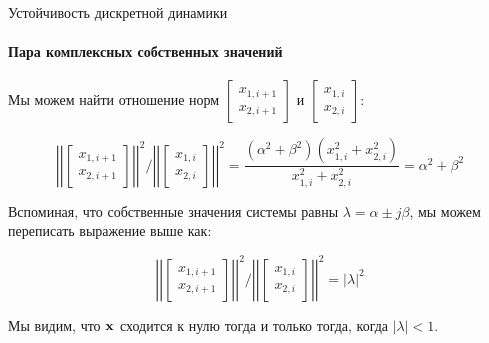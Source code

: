 \documentclass{beamer}
\begin{document}
\begin{frame}{Устойчивость дискретной динамики}
	\framesubtitle{Пара комплексных собственных значений}
	\begin{flushleft}
		
		Мы можем найти отношение норм $\begin{bmatrix}
			x_{1, i+1} \\ x_{2, i+1}
		\end{bmatrix}$ и $\begin{bmatrix}
			x_{1, i} \\ x_{2, i}
		\end{bmatrix}$: 
		
		\begin{equation}
			\left | \left|
			\begin{bmatrix}
				x_{1, i+1} \\ x_{2, i+1}
			\end{bmatrix}
			\right | \right|^2 
			/ 
			\left | \left|
			\begin{bmatrix}
				x_{1, i} \\ x_{2, i}
			\end{bmatrix}
			\right | \right|^2
			=
			\frac{(\alpha^2 + \beta^2) (x_{1, i}^2 + x_{2, i}^2)}{x_{1, i}^2 + x_{2, i}^2}
			= 
			\alpha^2 + \beta^2
		\end{equation}
		
		Вспоминая, что собственные значения системы равны $\lambda  = \alpha \pm j\beta$, мы можем переписать выражение выше как:
		
		\begin{equation}
			\left | \left|
			\begin{bmatrix}
				x_{1, i+1} \\ x_{2, i+1}
			\end{bmatrix}
			\right | \right|^2 
			/ 
			\left | \left|
			\begin{bmatrix}
				x_{1, i} \\ x_{2, i}
			\end{bmatrix}
			\right | \right|^2
			= 
			| \lambda |^2
		\end{equation}		
		
		Мы видим, что $\mathbf{x}$ сходится к нулю тогда и только тогда, когда $|\lambda| < 1$.
		
	\end{flushleft}
\end{frame}
\end{document}
